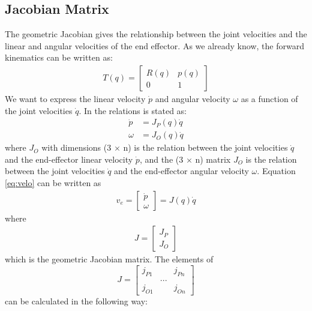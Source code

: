 \subsection{Jacobian Matrix}
The geometric Jacobian gives the relationship between the joint velocities and the linear and angular velocities of the end effector\cite{Siciliano,spong}. As we already know, the forward kinematics can be written as:
\begin{align*}
    T(q) = 
    \begin{bmatrix}
        R(q) & p(q)\\
        0 & 1
    \end{bmatrix}
\end{align*}
We want to express the linear velocity $\dot{p}$ and angular velocity $\omega$ as a function of the joint velocities $\dot{q}$. In \cite{Siciliano} the relations is stated as:
\begin{equation}
    \begin{aligned}\label{eq:velo}
        \dot{p} &= J_P(q)\dot{q}\\
        \omega&= J_O(q)\dot{q}
    \end{aligned}
\end{equation}
where $J_O$ with dimensions (3 $\times$ n) is the relation between the joint velocities $\dot{q}$ and the end-effector linear velocity $\dot{p}$, and the (3 $\times$ n) matrix $J_O$ is the relation between the joint velocities $\dot{q}$ and the end-effector angular velocity $\omega$. Equation \eqref{eq:velo} can be written as
\begin{align*}
    v_e = 
    \begin{bmatrix}
        \dot{p} \\ \omega
    \end{bmatrix}
    = J(q)\dot{q}
\end{align*}
where
\begin{align*}
    J = 
    \begin{bmatrix}
        J_P \\ J_O
    \end{bmatrix}
\end{align*}
which is the geometric Jacobian matrix. The elements of 
$$
J = 
\begin{bmatrix}
    j_{P1} & & j_{Pn}\\
    &...&\\
    j_{O1} & & j_{On}
\end{bmatrix}
$$
can be calculated in the following way:
